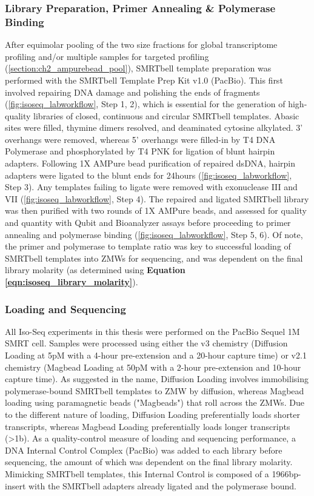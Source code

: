 \subsubsection{Library Preparation, Primer Annealing \& Polymerase Binding}
\label{section:ch2_smrtbelltemplate_explanation} 
After equimolar pooling of the two size fractions for global transcriptome profiling and/or multiple samples for targeted profiling (\cref{section:ch2_ampurebead_pool}), SMRTbell template preparation was performed with the SMRTbell Template Prep Kit v1.0 (PacBio). This first involved repairing DNA damage and polishing the ends of fragments (\cref{fig:isoseq_labworkflow}, Step 1, 2), which is essential for the generation of high-quality libraries of closed, continuous and circular SMRTbell templates. Abasic sites were filled, thymine dimers resolved, and deaminated cytosine alkylated. 3’ overhangs were removed, whereas 5’ overhangs were filled-in by T4 DNA Polymerase and phosphorylated by T4 PNK for ligation of blunt hairpin adapters. Following 1X AMPure bead purification of repaired dsDNA, hairpin adapters were ligated to the blunt ends for 24hours (\cref{fig:isoseq_labworkflow}, Step 3). Any templates failing to ligate were removed with exonuclease III and VII (\cref{fig:isoseq_labworkflow}, Step 4). The repaired and ligated SMRTbell library was then purified with two rounds of 1X AMPure beads, and assessed for quality and quantity with Qubit and Bioanalyzer assays before proceeding to primer annealing and polymerase binding (\cref{fig:isoseq_labworkflow}, Step 5, 6). Of note, the primer and polymerase to template ratio was key to successful loading of SMRTbell templates into ZMWs for sequencing, and was dependent on the final library molarity (as determined using \textbf{Equation \ref{eqn:isoseq_library_molarity}}). 


\subsubsection{Loading and Sequencing} 
\label{section:ch2_sequencing}
All Iso-Seq experiments in this thesis were performed on the PacBio Sequel 1M SMRT cell. Samples were processed using either the v3 chemistry (Diffusion Loading at 5pM with a 4-hour pre-extension and a 20-hour capture time) or v2.1 chemistry (Magbead Loading at 50pM with a 2-hour pre-extension and 10-hour capture time). As suggested in the name, Diffusion Loading involves immobilising polymerase-bound SMRTbell templates to ZMW by diffusion, whereas Magbead loading using paramagnetic beads ("Magbeads") that roll across the ZMWs. Due to the different nature of loading, Diffusion Loading preferentially loads shorter transcripts, whereas Magbead Loading preferentially loads longer transcripts (>1b). As a quality-control measure of loading and sequencing performance, a DNA Internal Control Complex (PacBio) was added to each library before sequencing, the amount of which was dependent on the final library molarity. Mimicking SMRTbell templates, this Internal Control is composed of a 1966bp-insert with the SMRTbell adapters already ligated and the  polymerase bound.


